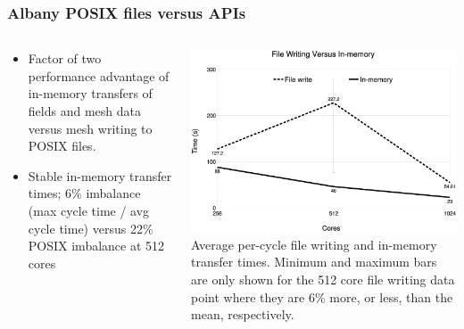 \documentclass{beamer}
\begin{document}
\begin{frame}
  \frametitle{Albany POSIX files versus APIs}
  \begin{columns}
    \begin{column}{0.5\textwidth}
      \begin{itemize}
        \item Factor of two performance advantage of in-memory transfers of
          fields and mesh data versus mesh writing to POSIX files.
        \item Stable in-memory transfer times; 
          6\% imbalance (max cycle time / avg cycle time) versus 
          22\% POSIX imbalance at 512 cores
      \end{itemize}
    \end{column}
    \begin{column}{0.5\textwidth}
      \includegraphics[width=\textwidth]{../imp/results/albany/compare.eps}\\
      \small
      Average per-cycle file writing and in-memory transfer times.  Minimum and
      maximum bars are only shown for the 512 core file writing data point where
      they are 6\% more, or less, than the mean, respectively.
    \end{column}
  \end{columns}
\end{frame}
\end{document}
